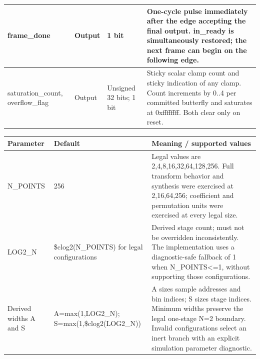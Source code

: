 \documentclass[11pt,a4paper]{article}
\begin{document}
{\begin{longtable}{@{}L{0.21\textwidth}|L{0.12\textwidth}|L{0.12\textwidth}|L{0.45\textwidth}@{}}
frame\_\allowbreak{}done & Output & 1 bit & One-cycle pulse immediately after the edge accepting the final output. in\_\allowbreak{}ready is simultaneously restored; the next frame can begin on the following edge.\\[2pt]\hline

saturation\_\allowbreak{}count,\allowbreak{} overflow\_\allowbreak{}flag & Output & Unsigned 32 bits; 1 bit & Sticky scalar clamp count and sticky indication of any clamp. Count increments by 0..4 per committed butterfly and saturates at 0xffffff\allowbreak{}ff. Both clear only on reset.\\[2pt]\hline

\bottomrule\end{longtable}}

{\small\renewcommand{\arraystretch}{1.18}\begin{longtable}{@{}L{0.22\textwidth}|L{0.21\textwidth}|L{0.49\textwidth}@{}}\toprule

\textbf{Parameter} & \textbf{Default} & \textbf{Meaning /\allowbreak{} supported values}\\\midrule\endhead

N\_\allowbreak{}POINTS & 256 & Legal values are 2,\allowbreak{}4,\allowbreak{}8,\allowbreak{}16,\allowbreak{}32,\allowbreak{}64,\allowbreak{}128,\allowbreak{}256. Full transform behavior and synthesis were exercised at 2,\allowbreak{}16,\allowbreak{}64,\allowbreak{}256; coefficient and permutation units were exercised at every legal size.\\[2pt]\hline

LOG2\_\allowbreak{}N & \$clog2(\allowbreak{}N\_\allowbreak{}POINTS)\allowbreak{} for legal configurations & Derived stage count; must not be overridden inconsistently. The implementation uses a diagnostic-safe fallback of 1 when N\_\allowbreak{}POINTS<=\allowbreak{}1,\allowbreak{} without supporting those configurations.\\[2pt]\hline

Derived widths A and S & A=\allowbreak{}max(\allowbreak{}1,\allowbreak{}LOG2\_\allowbreak{}N)\allowbreak{}; S=\allowbreak{}max(\allowbreak{}1,\allowbreak{}\$clog2(\allowbreak{}LOG2\_\allowbreak{}N)\allowbreak{})\allowbreak{} & A sizes sample addresses and bin indices; S sizes stage indices. Minimum widths preserve the legal one-stage N=\allowbreak{}2 boundary. Invalid configurations select an inert branch with an explicit simulation parameter diagnostic.\\[2pt]\hline

\bottomrule\end{longtable}}
\end{document}
